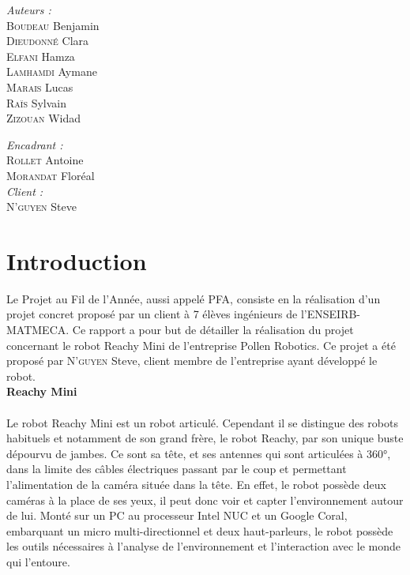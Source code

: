 \documentclass[a4paper,french]{article}
\begin{document}
\begin{titlepage}
\begin{minipage}[b]{0.40\linewidth}
        \flushleft 
        \large
        \emph{Auteurs :} \\
        \textsc{Boudeau} Benjamin\\
        \textsc{Dieudonné} Clara \\
        \textsc{Elfani} Hamza \\
        \textsc{Lamhamdi} Aymane \\
        \textsc{Marais} Lucas \\
        \textsc{Raïs} Sylvain \\
        \textsc{Zizouan} Widad\\
    \end{minipage} \hfill
    \begin{minipage}[b]{0.40\linewidth}
        \flushright 
        \large 
        \emph{Encadrant :} \\
        \textsc{Rollet} Antoine \\
        \textsc{Morandat} Floréal \\
        \emph{Client :} \\
        \textsc{N'guyen} Steve \\
    \end{minipage} \hfill

\end{titlepage}

\tableofcontents
\newpage

\section{Introduction}
Le Projet au Fil de l'Année, aussi appelé PFA, consiste en la réalisation d'un projet concret proposé par un client à 7 élèves ingénieurs de l'ENSEIRB-MATMECA. Ce rapport a pour but de détailler la réalisation du projet concernant le robot Reachy Mini de l'entreprise Pollen Robotics. Ce projet a été proposé par \textsc{N'guyen} Steve, client membre de l'entreprise ayant développé le robot. \\

\textbf{Reachy Mini} \\ \\
Le robot Reachy Mini est un robot articulé. Cependant il se distingue des robots habituels et notamment de son grand frère, le robot Reachy, par son unique buste dépourvu de jambes. Ce sont sa tête, et ses antennes qui sont articulées à 360°, dans la limite des câbles électriques passant par le coup et permettant l'alimentation de la caméra située dans la tête. En effet, le robot possède deux caméras à la place de ses yeux, il peut donc voir et capter l'environnement autour de lui. Monté sur un PC au processeur Intel NUC et un Google Coral, embarquant un micro multi-directionnel et deux haut-parleurs, le robot possède les outils nécessaires à l'analyse de l'environnement et l'interaction avec le monde qui l'entoure. \\
\end{document}
